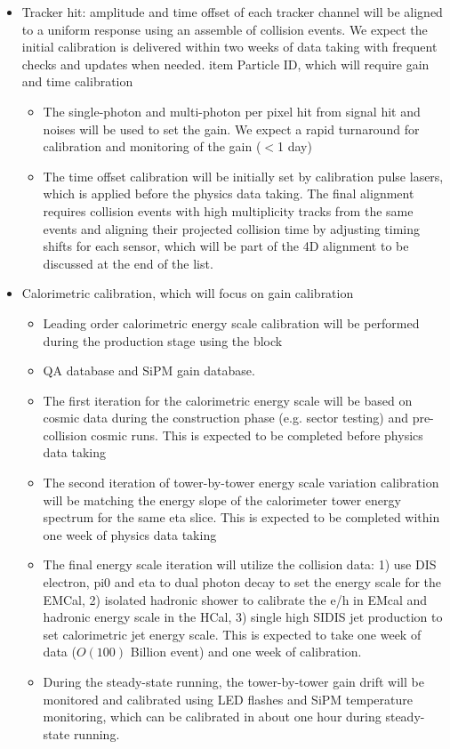 \begin{itemize}
\item Tracker hit: amplitude and time offset of each tracker channel will be aligned to a uniform response using an assemble of collision events. We expect the initial calibration is delivered within two weeks of data taking with frequent checks and updates when needed. 
item Particle ID, which will require gain and time calibration
\begin{itemize}
  \item The single-photon and multi-photon per pixel hit from signal hit and noises will be used to set the gain. We expect a rapid turnaround for calibration and monitoring of the gain ($<$1 day)
  \item The time offset calibration will be initially set by calibration pulse lasers, which is applied before the physics data taking. The final alignment requires collision events with high multiplicity tracks from the same events and aligning their projected collision time by adjusting timing shifts for each sensor, which will be part of the 4D alignment to be discussed at the end of the list. 
\end{itemize}
\item Calorimetric calibration, which will focus on gain calibration
\begin{itemize}
  \item Leading order calorimetric energy scale calibration will be performed during the production stage using the block 
  \item QA database and SiPM gain database. 
  \item The first iteration for the calorimetric energy scale will be based on cosmic data during the construction phase (e.g. sector testing) and pre-collision cosmic runs. This is expected to be completed before physics data taking
  \item The second iteration of tower-by-tower energy scale variation calibration will be matching the energy slope of the calorimeter tower energy spectrum for the same eta slice.   This is expected to be completed within one week of physics data taking
  \item The final energy scale iteration will utilize the collision data: 1) use DIS electron, pi0 and eta to dual photon decay to set the energy scale for the EMCal, 2) isolated hadronic shower to calibrate the e/h in EMcal and hadronic energy scale in the HCal, 3) single high SIDIS jet production to set calorimetric jet energy scale. This is expected to take one week of data ($O(100)$ Billion event) and one week of calibration. 
  \item During the steady-state running, the tower-by-tower gain drift will be monitored and calibrated using LED flashes and SiPM temperature monitoring, which can be calibrated in about one hour during steady-state running. 
\end{itemize}


\end{itemize}
